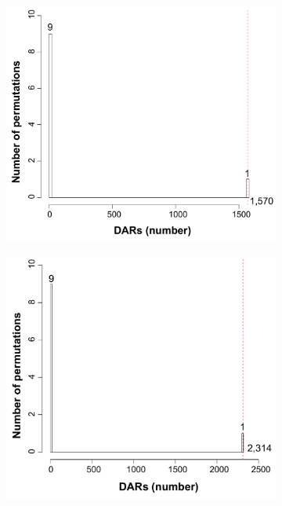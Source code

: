\begin{figure}[htbp]
\begin{subfigure}[b]{0.45\textwidth}
\caption{}
\end{subfigure}
~
\begin{subfigure}[b]{0.45\textwidth} 
\centering
\includegraphics[width=\textwidth]{./Appendix/pdfs/Chapter5/ATAC_PsA_CD8_permutation_analysis}%
\caption{}
\end{subfigure}
\begin{subfigure}[b]{0.45\textwidth} 
\centering
\includegraphics[width=\textwidth]{./Appendix/pdfs/Chapter5/ATAC_PsA_NK_permutation_analysis}%

\end{subfigure}
\end{figure}
